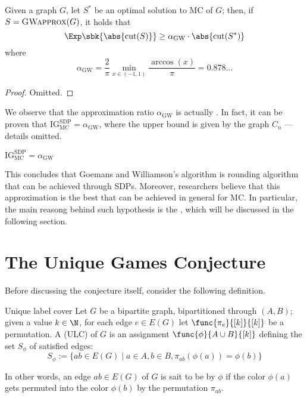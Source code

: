 \documentclass[a4paper, 12pt]{report}
\begin{document}
    \begin{framedthm}{}
        Given a graph $G$, let $S^*$ be an optimal solution to MC of $G$; then, if $S = \textsc{GWapprox}(G)$, it holds that $$\Exp \sbk{\abs{\mathrm{cut}(S)}} \ge \alpha_{\mathrm{GW}} \cdot \abs{\mathrm{cut}(S^*)}$$ where $$\alpha_{\mathrm{GW}} = \dfrac{2}{\pi} \min_{x \in (-1, 1)}{\dfrac{\arccos(x)}{\pi}} = 0.878  \ldots$$
    \end{framedthm}

    \begin{proof}
        Omitted.
    \end{proof}

    We observe that the approximation ratio $\alpha_{\mathrm{GW}}$ is actually . In fact, it can be proven that $\mathrm{IG}_{\mathrm{MC}}^{\mathrm{SDP}} = \alpha_{\mathrm{GW}}$, where the upper bound is given by the graph $C_n$ --- details omitted.

    \begin{framedthm}{}
        $\mathrm{IG}_{\mathrm{MC}}^{\mathrm{SDP}} = \alpha_{\mathrm{GW}}$
    \end{framedthm}

    This concludes that Goemans and Williamson's algorithm is  rounding algorithm that can be achieved through SDPs. Moreover, researchers believe that this approximation is the best that can be achieved in general for MC. In particular, the main reasong behind such hypothesis is the , which will be discussed in the following section.

    \section{The Unique Games Conjecture}

    Before discussing the conjecture itself, consider the following definition.

    \begin{frameddefn}{Unique label cover}
        Let $G$ be a bipartite graph, bipartitioned through $(A, B)$; given a value $k \in \N$, for each edge $e \in E(G)$ let $\func{\pi_e}{[k]}{[k]}$ be a permutation. A  (ULC) of $G$ is an assignment $\func{\phi}{A \cup B}{[k]}$ defining the set $S_\phi$ of satisfied edges: $$S_\phi := \{ab \in E(G) \mid a \in A, b \in B, \pi_{ab}(\phi(a)) = \phi(b)\}$$
    \end{frameddefn}

    In other words, an edge $ab \in E(G)$ of $G$ is sait to be  by $\phi$ if the color $\phi(a)$ gets permuted into the color $\phi(b)$ by the permutation $\pi_{ab}$.
\end{document}
